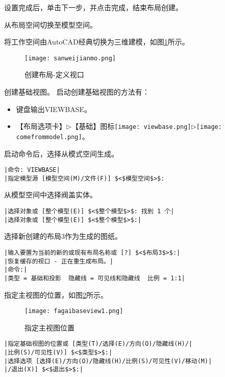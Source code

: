 \begin{procedure}
设置完成后，单击下一步，并点击完成，结束布局创建。
\item 从布局空间切换至模型空间。
\item 将工作空间由AutoCAD经典切换为三维建模，如图\ref{fig:sanweijianmo}所示。
\begin{figure}[htbp]
\centering
\texttt{[image: sanweijianmo.png]}
\caption{创建布局-定义视口}\label{fig:sanweijianmo}
\end{figure}
\item 创建基础视图。
启动创建基础视图的方法有：
\begin{itemize}
\item 键盘输出VIEWBASE。
\item 【布局选项卡】$\triangleright$【基础】图标\texttt{[image: viewbase.png]}$\triangleright$\texttt{[image: comefrommodel.png]}。
\end{itemize}
\newpage
启动命令后，选择从模式空间生成。
\begin{lstlisting}
|命令: VIEWBASE|
|指定模型源 [模型空间(M)/文件(F)] $<$模型空间$>$:
\end{lstlisting}
从模型空间中选择阀盖实体。
\begin{lstlisting}
|选择对象或 [整个模型(E)] $<$整个模型$>$: 找到 1 个|
|选择对象或 [整个模型(E)] $<$整个模型$>$:|
\end{lstlisting}
选择新创建的布局3作为生成的图纸。
\begin{lstlisting}
|输入要置为当前的新的或现有布局名称或 [?] $<$布局3$>$:|
|恢复缓存的视口 - 正在重生成布局。|
|命令:|
|类型 = 基础和投影  隐藏线 = 可见线和隐藏线  比例 = 1:1|
\end{lstlisting}
指定主视图的位置，如图\ref{fig:fagaibaseview1}所示。
\begin{figure}[htbp]
\centering
\texttt{[image: fagaibaseview1.png]}
\caption{指定主视图位置}\label{fig:fagaibaseview1}
\end{figure}
\begin{lstlisting}
|指定基础视图的位置或 [类型(T)/选择(E)/方向(O)/隐藏线(H)/|
|比例(S)/可见性(V)] $<$类型$>$:|
|选择选项 [选择(E)/方向(O)/隐藏线(H)/比例(S)/可见性(V)/移动(M)|
|/退出(X)] $<$退出$>$:|
\end{lstlisting}


\end{procedure}
